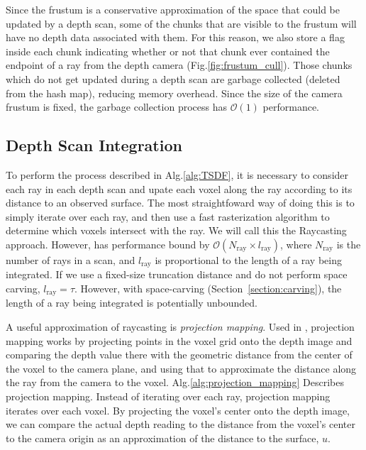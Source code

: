 \documentclass[10pt,twocolumn,letterpaper]{article}
\newcommand{\sref}[1]{Section~\ref{#1}}
\newcommand{\figref}[1]{Fig.\ref{#1}}
\newcommand{\algoref}[1]{Alg.\ref{#1}}
\begin{document}
Since the frustum is a conservative approximation of the space that could be
updated by a depth scan, some of the chunks that are visible to the frustum will
have no depth data associated with them. For this reason, we also store a flag
inside each chunk indicating whether or not that chunk ever contained the
endpoint of a ray from the depth camera (\figref{fig:frustum_cull}). Those
chunks which do not get updated during a depth scan are garbage collected
(deleted from the hash map), reducing memory overhead. Since the size of the
camera frustum is fixed, the garbage collection process has $\mathcal{O}(1)$
performance.

\subsection{Depth Scan Integration}
\label{section:scan_integration}
To perform the process described in \algoref{alg:TSDF}, it is necessary
to consider each ray in each depth scan and upate each voxel
along the ray according to its distance to an observed surface. The most
straightfoward way of doing this is to simply iterate over each ray, and then
use a fast rasterization algorithm \cite{RayTracing} to determine which voxels
intersect with the ray. We will call this the Raycasting approach.
However, has performance bound by $\mathcal{O}(N_{\text{ray}} \times
l_{\text{ray}})$, where $N_{\text{ray}}$ is the number of rays in a scan, and $l_{\text{ray}}$  is 
proportional to the length of a ray being integrated. If we use a fixed-size
truncation distance and do not perform space carving, $l_{\text{ray}} = \tau$.
However, with space-carving (\sref{section:carving}), the length of a ray
being integrated is potentially unbounded.

A useful approximation of raycasting is \textit{projection mapping}. Used in
\cite{Newcombe,Nguyen2012, Bylow2013, Klingensmith2014}, projection mapping
works by projecting points in the voxel grid onto the depth image and comparing the depth value
there with the geometric distance from the center of the voxel to the camera
plane, and using that to approximate the distance along the ray from the camera
to the voxel. \algoref{alg:projection_mapping} Describes projection mapping.
Instead of iterating over each ray, projection mapping iterates over each voxel. By projecting the voxel's center
onto the depth image, we can compare the actual depth reading to the distance
from the voxel's center to the camera origin as an approximation of the
distance to the surface, $u$. 
\end{document}
